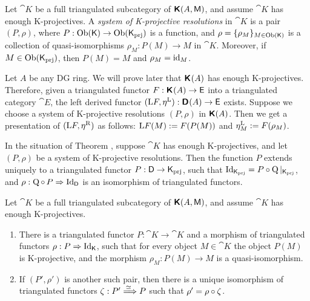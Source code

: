 \begin{dfn} \label{dfn:1524}
Let $\cat{K}$ be a full triangulated subcategory of 
$\boldsymbol{\mathsf{K}}(A, \operatorname{\mathsf{M}})$, and assume $\cat{K}$ has enough K-projectives.
A  {\em system of K-projective resolutions} in $\cat{K}$ is a pair $(P, \rho)$, 
where $P : \operatorname{Ob}(\operatorname{\mathsf{K}}) \to \operatorname{Ob}(\operatorname{\mathsf{K}}_{\mathrm{prj}})$
is a function, and 
$\rho = \{ \rho_M \}_{M \in \operatorname{Ob}(\operatorname{\mathsf{K}})}$ 
is a collection of quasi-isomorphisms
$\rho_M : P(M) \to M$ in $\cat{K}$.
Moreover, if $M \in \operatorname{Ob}(\operatorname{\mathsf{K}}_{\mathrm{prj}})$, then 
$P(M) = M$ and $\rho_M = \operatorname{id}_M$. 
\end{dfn}

\begin{exa} \label{exa:1531}
Let $A$ be any DG ring. We will prove later that $\operatorname{\boldsymbol{\mathsf{K}}}^{}(A)$
has enough K-projectives. Therefore, given a triangulated functor 
$F : \operatorname{\boldsymbol{\mathsf{K}}}^{}(A) \to \operatorname{\mathsf{E}}$ into a triangulated category $\cat{E}$, 
the left derived functor  
$(\mathrm{L} F, \eta^{\mathrm{L}}) : \operatorname{\boldsymbol{\mathsf{D}}}^{}(A) \to \operatorname{\mathsf{E}}$
exists. Suppose we choose a system  of K-projective resolutions $(P, \rho)$ in 
$\operatorname{\boldsymbol{\mathsf{K}}}(A)$. Then we get a presentation of $(\mathrm{L} F, \eta^{\mathrm{R}})$ as 
follows: $\mathrm{L} F(M) := F(P(M))$ and $\eta^{\mathrm{L}}_M := F(\rho_M)$. 
\end{exa}

\begin{prop} \label{prop:1522}
In the situation of Theorem \tup{\ref{thm:3145}}, suppose $\cat{K}$ has enough 
K-projectives, and let $(P, \rho)$ be a system  of K-projective resolutions.
Then the function $P$ extends uniquely to a triangulated functor
$P : \operatorname{\mathsf{D}} \to \operatorname{\mathsf{K}}_{\mathrm{prj}}$, such that 
$\operatorname{Id}_{\operatorname{\mathsf{K}}_{\mathrm{prj}}} = P \circ \operatorname{Q}|_{\operatorname{\mathsf{K}}_{\mathrm{prj}}}$, 
and 
$\rho :  \operatorname{Q} \circ \, P  \Rightarrow \operatorname{Id}_{\operatorname{\mathsf{D}}}$
is an isomorphism of triangulated functors.
\end{prop}

\begin{cor} \label{cor:1921}
Let $\cat{K}$ be a full triangulated subcategory of 
$\boldsymbol{\mathsf{K}}(A, \operatorname{\mathsf{M}})$, and assume $\cat{K}$ has enough K-projectives.
\begin{enumerate}
\item There is a triangulated functor 
$P : \cat{K} \to \cat{K}$ and a morphism of triangulated functors 
$\rho : P \Rightarrow \operatorname{Id}_{\operatorname{\mathsf{K}}}$, such that for every object 
$M \in \cat{K}$
the object $P(M)$ is K-projective, and the morphism 
$\rho_M : P(M) \to M$ is a quasi-isomorphism. 

\item If $(P', \rho')$ is another such pair, then there is a unique isomorphism 
of triangulated functors $\zeta : P' \stackrel{\simeq\ }{\Longrightarrow} P$ such that 
$\rho' =  \rho \circ \zeta$. 
\end{enumerate}
\end{cor}




